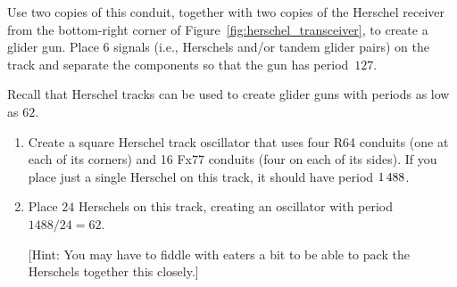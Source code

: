 \begin{multicols}{2}
\begin{problem}
		\begin{center}
		\end{center}
		
		\noindent Use two copies of this conduit, together with two copies of the Herschel receiver from the bottom-right corner of Figure~\ref{fig:herschel_transceiver}, to create a glider gun. Place $6$ signals (i.e., Herschels and/or tandem glider pairs) on the track and separate the components so that the gun has period~$127$.
	\end{problem}
	
	
	\mfilbreak
	
	
	\begin{problem}\label{exer:p62_gun_problem}
		Recall that Herschel tracks can be used to create glider guns with periods as low as $62$.\smallskip
		
		\begin{enumerate}[label=\bf\color{ocre}(\alph*)]
			\item {} Create a square Herschel track oscillator that uses four R64 conduits (one at each of its corners) and 16 Fx77 conduits (four on each of its sides). If you place just a single Herschel on this track, it should have period $1{\,}488$.
			
			\item {} Place $24$ Herschels on this track, creating an oscillator with period $1488/24 = 62$.
			
			[Hint: You may have to fiddle with eaters a bit to be able to pack the Herschels together this closely.]
			

\end{enumerate}
\end{problem}
\end{multicols}

